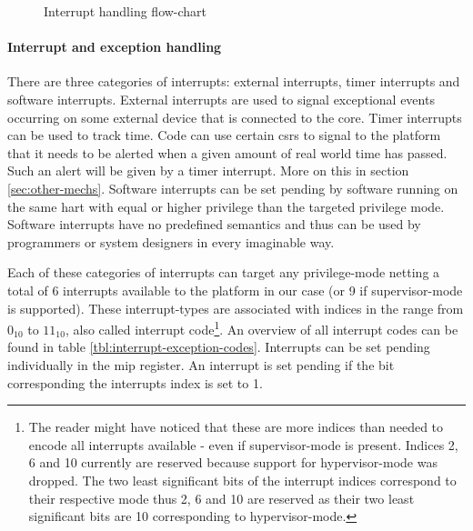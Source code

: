 \begin{figure}
\begin{adjustbox}{max width=\textwidth}
    \end{adjustbox}
    \caption{Interrupt handling flow-chart}
    \label{fig:interrupt-handling}
\end{figure}

\paragraph{Interrupt and exception handling}
There are three categories of interrupts: external interrupts, timer interrupts and software interrupts.
External interrupts are used to signal exceptional events occurring on some external device that is connected to the core.
Timer interrupts can be used to track time.
Code can use certain \glspl{csr} to signal to the platform that it needs to be alerted when a given amount of real world time has passed.
Such an alert will be given by a timer interrupt.
More on this in section \ref{sec:other-mechs}.
Software interrupts can be set pending by software running on the same \gls{hart} with equal or higher privilege than the targeted privilege mode.
Software interrupts have no predefined semantics and thus can be used by programmers or system designers in every imaginable way.

Each of these categories of interrupts can target any privilege-mode netting a total of 6 interrupts available to the platform in our case (or 9 if supervisor-mode is supported).
These interrupt-types are associated with indices in the range from $ 0_{10} $ to $ 11_{10} $, also called interrupt code\footnote{%
    The reader might have noticed that these are more indices than needed to encode all interrupts available - even if supervisor-mode is present.
    Indices 2, 6 and 10 currently are reserved because support for hypervisor-mode was dropped.
    The two least significant bits of the interrupt indices correspond to their respective mode thus 2, 6 and 10 are reserved as their two least significant bits are 10 corresponding to hypervisor-mode.
}.
An overview of all interrupt codes can be found in table \ref{tbl:interrupt-exception-codes}.
Interrupts can be set pending individually in the \gls{mip} register.
An interrupt is set pending if the bit corresponding the interrupts index is set to 1.

